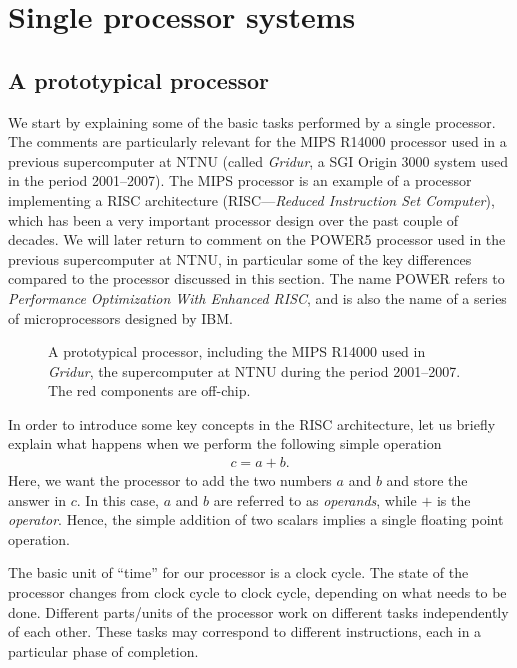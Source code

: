 \chapter{Single processor systems}

\section{A prototypical processor}

We start by explaining some of the basic tasks performed by a single processor.
The comments are particularly relevant for the MIPS R14000 processor used in a
previous supercomputer at NTNU (called \emph{Gridur}, a SGI Origin 3000 system
used in the period 2001--2007). The MIPS processor is an example of a processor
implementing a RISC architecture (RISC---\emph{Reduced Instruction Set
Computer}), which has been a very important processor design over the past
couple of decades. We will later return to comment on the POWER5 processor
used in the previous supercomputer at NTNU, in particular some of the key
differences compared to the processor discussed in this section. The name POWER
refers to \emph{Performance Optimization With Enhanced RISC}, and is also the
name of a series of microprocessors designed by IBM.

\begin{figure}[htbp]
  \centering
  
  \caption{
    A prototypical processor, including the MIPS R14000 used in \emph{Gridur},
    the supercomputer at NTNU during the period 2001--2007. The red components
    are off-chip.
  }
  \label{fig:Lande}
\end{figure}

In order to introduce some key concepts in the RISC architecture, let us briefly
explain what happens when we perform the following simple operation
\begin{align}
  c = a + b.
  \label{single:add1}
\end{align}
Here, we want the processor to add the two numbers $a$ and $b$ and store the
answer in $c$. In this case, $a$ and $b$ are referred to as \emph{operands},
while $+$ is the \emph{operator}. Hence, the simple addition of two scalars
implies a single floating point operation.

The basic unit of ``time'' for our processor is a clock cycle. The state of the
processor changes from clock cycle to clock cycle, depending on what needs to be
done. Different parts/units of the processor work on different tasks
independently of each other. These tasks may correspond to different
instructions, each in a particular phase of completion.

